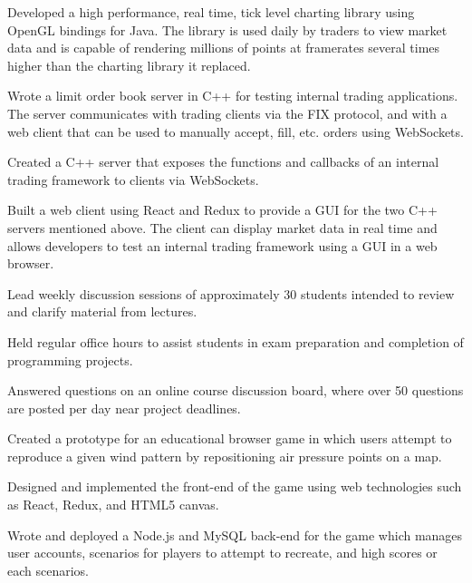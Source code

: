 \documentclass[10pt]{article}
\begin{document}

\begin{bullets}
  \item Developed a high performance, real time, tick level charting library using OpenGL bindings for Java.
        The library is used daily by traders to view market data and is capable of rendering millions of points
        at framerates several times higher than the charting library it replaced.
  \item Wrote a limit order book server in C++ for testing internal trading applications. The server communicates
        with trading clients via the FIX protocol, and with a web client that can be used to manually accept, fill,
        etc. orders using WebSockets.
  \item Created a C++ server that exposes the functions and callbacks of an internal trading framework to clients
        via WebSockets.
  \item Built a web client using React and Redux to provide a GUI for the two C++ servers mentioned above. The client
        can display market data in real time and allows developers to test an internal trading framework using a GUI
        in a web browser.
\end{bullets}

\begin{bullets}
  \item Lead weekly discussion sessions of approximately 30 students intended to review and clarify material
        from lectures.
  \item Held regular office hours to assist students in exam preparation and completion of programming projects.
  \item Answered questions on an online course discussion board, where over 50 questions are posted per day
        near project deadlines.
\end{bullets}

\begin{bullets}
  \item Created a prototype for an educational browser game in which users attempt to reproduce a given wind
        pattern by repositioning air pressure points on a map.
  \item Designed and implemented the front-end of the game using web technologies such as React, Redux, and
        HTML5 canvas.
  \item Wrote and deployed a Node.js and MySQL back-end for the game which manages user accounts, scenarios
        for players to attempt to recreate, and high scores or each scenarios.
\end{bullets}
\end{document}
